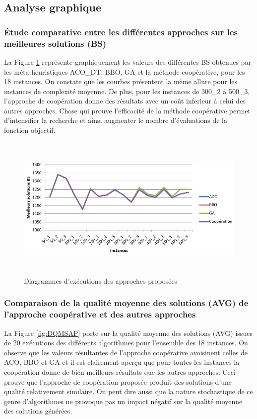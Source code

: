\subsection{Analyse graphique}

\subsubsection{Étude comparative entre les différentes approches sur les meilleures solutions (BS) }

La Figure \ref{fig:DEAP} représente graphiquement les valeurs des différentes BS obtenues
par les méta-heuristiques  ACO\_DT, BBO, GA et la méthode coopérative, pour les 18 instances. On constate que les courbes présentent la même allure pour les instances de complexité moyenne. De plus, pour les instances de 300\_2 à 500\_3, l’approche de coopération  donne des résultats avec un coût inferieur à celui des autres approches. Chose qui prouve l’efficacité de la méthode coopérative permet d’intensifier la recherche et ainsi augmenter le nombre d’évaluations de la fonction objectif.

\begin{figure}[H]
	\centering
	\includegraphics[width=16cm,height=7cm]{Chap5/5.png}
	\caption{Diagrammes d’exécutions des approches proposées}
	\label{fig:DEAP}
\end{figure}



\subsubsection{Comparaison de la qualité moyenne des solutions (AVG) de l’approche coopérative  et des autres approches}

La Figure \ref{fig:DQMSAP} porte sur la qualité moyenne des solutions (AVG) issues de 20 exécutions des différents algorithmes pour l’ensemble des 18 instances. On observe que les valeurs résultantes de l’approche coopérative avoisinent celles de ACO, BBO et GA et il est clairement aperçu que pour toutes les instances la coopération donne de bien meilleurs résultats que les autres approches. Ceci prouve que l’approche de coopération proposée produit des solutions d’une qualité relativement similaire. On peut dire aussi que la nature stochastique de ce genre d’algorithmes ne provoque pas un impact négatif sur la qualité moyenne des solutions générées.


